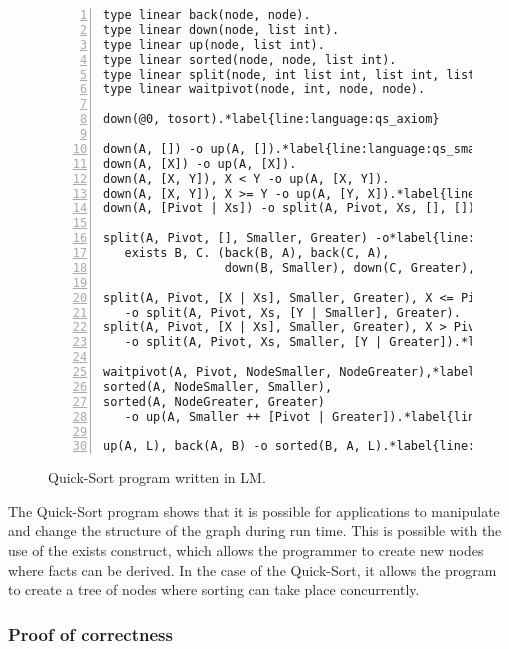\begin{figure}[h!]
\begin{Verbatim}[numbers=left,fontsize=\codesize,commandchars=\*\{\}]
type linear back(node, node).
type linear down(node, list int).
type linear up(node, list int).
type linear sorted(node, node, list int).
type linear split(node, int list int, list int, list int).
type linear waitpivot(node, int, node, node).

down(@0, tosort).*label{line:language:qs_axiom}

down(A, []) -o up(A, []).*label{line:language:qs_small1}
down(A, [X]) -o up(A, [X]).
down(A, [X, Y]), X < Y -o up(A, [X, Y]).
down(A, [X, Y]), X >= Y -o up(A, [Y, X]).*label{line:language:qs_small2}
down(A, [Pivot | Xs]) -o split(A, Pivot, Xs, [], []).*label{line:language:qs_complex}

split(A, Pivot, [], Smaller, Greater) -o*label{line:language:qs_exists1}
   exists B, C. (back(B, A), back(C, A),
                 down(B, Smaller), down(C, Greater), waitpivot(A, Pivot, B, C)).*label{line:language:qs_exists2}

split(A, Pivot, [X | Xs], Smaller, Greater), X <= Pivot*label{line:language:qs_split1}
   -o split(A, Pivot, Xs, [Y | Smaller], Greater).
split(A, Pivot, [X | Xs], Smaller, Greater), X > Pivot
   -o split(A, Pivot, Xs, Smaller, [Y | Greater]).*label{line:language:qs_split2}
   
waitpivot(A, Pivot, NodeSmaller, NodeGreater),*label{line:language:qs_sorted1}
sorted(A, NodeSmaller, Smaller),
sorted(A, NodeGreater, Greater)
   -o up(A, Smaller ++ [Pivot | Greater]).*label{line:language:qs_sorted2}*label{line:language:qs_up} // Append the lists.

up(A, L), back(A, B) -o sorted(B, A, L).*label{line:language:qs_back}
\end{Verbatim}
  \caption{Quick-Sort program written in LM.}
  \label{language:code:quicksort}
\end{figure}

The Quick-Sort program shows that it is possible for applications to manipulate
and change the structure of the graph during run time. This is possible with the
use of the exists construct, which allows the programmer to create new nodes
where facts can be derived. In the case of the Quick-Sort, it allows the program
to create a tree of nodes where sorting can take place concurrently.

\subsubsection{Proof of correctness}

